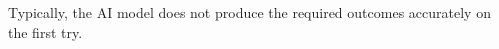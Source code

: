 
\section{}


Typically, the AI model does not produce the required outcomes accurately on the first try.